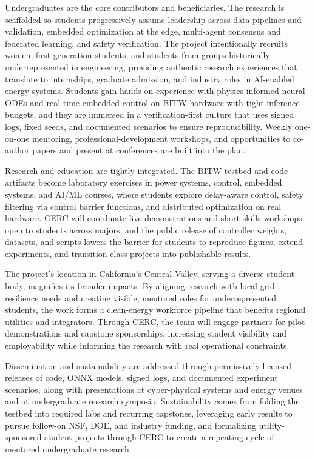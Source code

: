 \documentclass[12pt]{article}
\begin{document}
Undergraduates are the core contributors and beneficiaries. The research is scaffolded so students progressively assume leadership across data pipelines and validation, embedded optimization at the edge, multi-agent consensus and federated learning, and safety verification. The project intentionally recruits women, first-generation students, and students from groups historically underrepresented in engineering, providing authentic research experiences that translate to internships, graduate admission, and industry roles in AI-enabled energy systems. Students gain hands-on experience with physics-informed neural ODEs and real-time embedded control on BITW hardware with tight inference budgets, and they are immersed in a verification-first culture that uses signed logs, fixed seeds, and documented scenarios to ensure reproducibility. Weekly one-on-one mentoring, professional-development workshops, and opportunities to co-author papers and present at conferences are built into the plan.

Research and education are tightly integrated. The BITW testbed and code artifacts become laboratory exercises in power systems, control, embedded systems, and AI/ML courses, where students explore delay-aware control, safety filtering via control barrier functions, and distributed optimization on real hardware. CERC will coordinate live demonstrations and short skills workshops open to students across majors, and the public release of controller weights, datasets, and scripts lowers the barrier for students to reproduce figures, extend experiments, and transition class projects into publishable results.

The project's location in California's Central Valley, serving a diverse student body, magnifies its broader impacts. By aligning research with local grid-resilience needs and creating visible, mentored roles for underrepresented students, the work forms a clean-energy workforce pipeline that benefits regional utilities and integrators. Through CERC, the team will engage partners for pilot demonstrations and capstone sponsorships, increasing student visibility and employability while informing the research with real operational constraints.

Dissemination and sustainability are addressed through permissively licensed releases of code, ONNX models, signed logs, and documented experiment scenarios, along with presentations at cyber-physical systems and energy venues and at undergraduate research symposia. Sustainability comes from folding the testbed into required labs and recurring capstones, leveraging early results to pursue follow-on NSF, DOE, and industry funding, and formalizing utility-sponsored student projects through CERC to create a repeating cycle of mentored undergraduate research.
\end{document}
